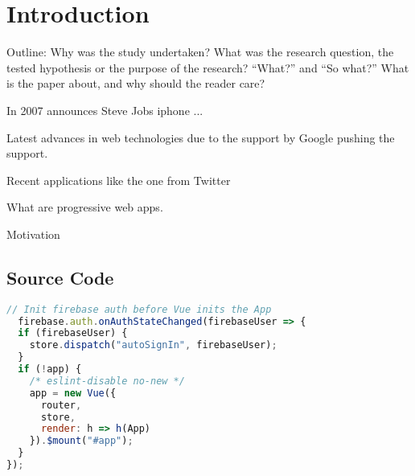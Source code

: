 \chapter{Introduction}

Outline: Why was the study undertaken?
What was the research question, the tested hypothesis or the purpose of the research?
“What?” and “So what?” What is the paper
about, and why should the reader care?

In 2007 announces Steve Jobs iphone ...

Latest advances in web technologies due to the support by Google pushing the support.

Recent applications like the one from Twitter

What are progressive web apps.

Motivation
\cite{liebelProgressiveWebApps2019}

\section{Source Code}

\begin{lstlisting}[language=JavaScript, caption=Firebase Auth initiation, label=lst:firebase-auth]
// Init firebase auth before Vue inits the App
  firebase.auth.onAuthStateChanged(firebaseUser => {
  if (firebaseUser) {
    store.dispatch("autoSignIn", firebaseUser);
  }
  if (!app) {
    /* eslint-disable no-new */
    app = new Vue({
      router,
      store,
      render: h => h(App)
    }).$mount("#app");
  }
});
\end{lstlisting}
